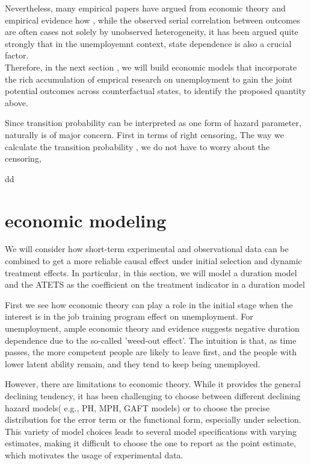 \documentclass{article}
\begin{document}
Nevertheless, many empirical papers\cite{heckman1981heterogeneity,heckman1984method, torgovitsky2019nonparametric} have argued from economic theory and empirical evidence how , while the observed serial correlation between outcomes are often cases not solely by unobserved heterogeneity, it has been argued quite strongly that in the unemployemnt context, state dependence is also a crucial factor. 
\\ Therefore, in the next section , we will build economic models that incorporate the rich accumulation of emprical research on unemployment  to gain the joint potential outcomes across counterfactual states, to identify the proposed quantity above.



\koko

\begin{remark}
\koko 
Since transition probability can be interpreted as one form of hazard parameter, naturally is of major concern. First in terms of right censoring, 
The way we calculate the transition probability , we do not have to worry about the censoring, 
\end{remark}
\begin{theorem}
dd
\end{theorem}


\section{economic modeling}
We will consider how short-term experimental and observational data can be combined to get a more reliable causal effect under initial selection and dynamic treatment effects.
 In particular, in this section, we will model a duration model and the ATETS as the coefficient on the treatment indicator in a duration model
 
First we see how economic theory can play a role in the initial stage when the interest is in the job training program effect on unemployment.
      For unemployment, ample economic theory and evidence suggests negative duration dependence due to the so-called 'weed-out effect'. The intuition is that, as time passes, the more competent people are likely to leave first, and the people with lower latent ability remain, and they tend to keep being unemployed.
      
         However, there are limitations to economic theory. While it provides the general declining tendency, it has been challenging to choose between different declining hazard models( e.g., PH, MPH, GAFT models) or to choose the precise distribution for the error term or the functional form, especially under selection. This variety of model choices leads to several model specifications with varying estimates, making it difficult to choose the one to report as the point estimate, which motivates the usage of experimental data.
         
\end{document}

